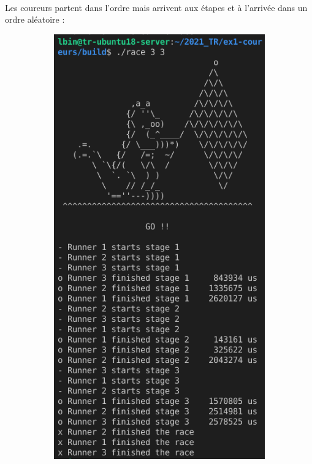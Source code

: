 \documentclass{article}
\begin{document}
    \paragraph{}
    Les coureurs partent dans l'ordre mais arrivent aux étapes et à l'arrivée dans un ordre aléatoire :
    \begin{figure}[H]
        \centering
        \begin{subfigure}[b]{.48\textwidth}
            \centering
            \includegraphics[width=.905\textwidth]{./screenshots/race331.png}

\end{subfigure}
\end{figure}
\end{document}
